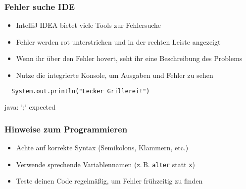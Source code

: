 \documentclass{../../presentation}
\begin{document}

\begin{frame}[fragile]
  \frametitle{Fehler suche IDE}
  \pause
  \begin{itemize}
    \item IntelliJ IDEA bietet viele Tools zur Fehlersuche
          \pause
    \item Fehler werden rot unterstrichen und in der rechten Leiste angezeigt
          \pause
    \item Wenn ihr über den Fehler hovert, seht ihr eine Beschreibung des Problems
          \pause
    \item Nutze die integrierte Konsole, um Ausgaben und Fehler zu sehen \newline
  \end{itemize}
  \begin{verbatim}
  System.out.println("Lecker Grillerei!")
  \end{verbatim}
  \pause
  \begin{ausgabe}
    \color{red}java: ';' expected
  \end{ausgabe}
\end{frame}

\begin{frame}[fragile]
  \frametitle{Hinweise zum Programmieren}
  \pause
  \begin{itemize}
    \item Achte auf korrekte Syntax (Semikolons, Klammern, etc.)
          \pause
    \item Verwende sprechende Variablennamen (z.\,B. \texttt{alter} statt \texttt{x})
          \pause
    \item Teste deinen Code regelmäßig, um Fehler frühzeitig zu finden
  \end{itemize}
\end{frame}
\end{document}
